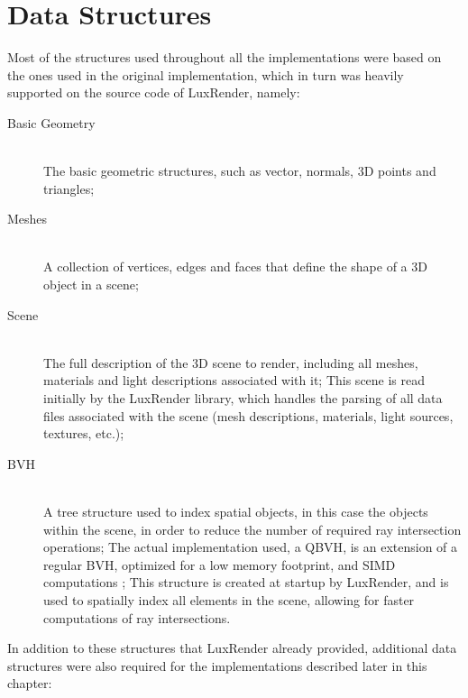 \documentclass[main.tex]{subfiles}
\begin{document}
\section{Data Structures} \label{section:data_structures}

Most of the structures used throughout all the implementations were based on the ones used in the original implementation, which in turn was heavily supported on the source code of LuxRender, namely:

\begin{description}
\item[Basic Geometry] \hfill \\
  The basic geometric structures, such as vector, normals, 3D points and triangles;

\item[Meshes] \hfill \\
  A collection of vertices, edges and faces that define the shape of a 3D object in a scene;

\item[Scene] \hfill \\
  The full description of the 3D scene to render, including all meshes, materials and light descriptions associated with it; This scene is read initially by the LuxRender library, which handles the parsing of all data files associated with the scene (mesh descriptions, materials, light sources, textures, etc.);

\item[\acl{BVH}] \hfill \\
  A tree structure used to index spatial objects, in this case the objects within the scene, in order to reduce the number of required ray intersection operations; The actual implementation used, a \acf{QBVH}, is an extension of a regular \acs{BVH}, optimized for a low memory footprint, and \acs{SIMD} computations \cite{dammertz2008shallow,Stich2009hpg}; This structure is created at startup by LuxRender, and is used to spatially index all elements in the scene, allowing for faster computations of ray intersections.

\end{description}

In addition to these structures that LuxRender already provided, additional data structures were also required for the implementations described later in this chapter:
\end{document}
